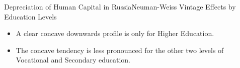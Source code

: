 \documentclass{beamer}
\begin{document}
\begin{frame}{Depreciation of Human Capital in Russia}{Neuman-Weiss Vintage Effects by Education Levels}
\begin{figure}
	\centering
	\hfill
	\hfill
\end{figure}
\begin{itemize}
	\item A clear concave downwards profile is only for Higher Education.
	\item The concave tendency is less pronounced for the other two levels of Vocational and Secondary education.
\end{itemize}
\end{frame}
\end{document}
